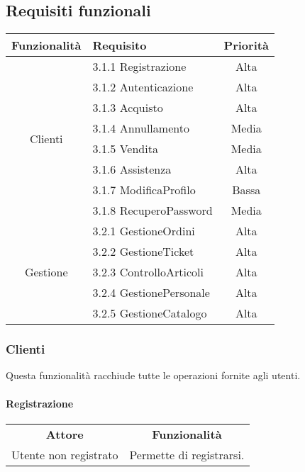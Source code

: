 \documentclass[12pt,a4paper]{article}
\begin{document}
\subsection{Requisiti funzionali}
\begin{center}
\begin{tabular}{|c|l|c|}
\hline
\rowcolor[gray]{0.8}
\textbf{Funzionalità} & \textbf{Requisito} & \textbf{Priorità} \\
\hline
\multirow{8}{*}{Clienti} & 3.1.1 Registrazione & Alta \\
& 3.1.2 Autenticazione & Alta \\
& 3.1.3 Acquisto & Alta \\
& 3.1.4 Annullamento & Media \\
& 3.1.5 Vendita & Media \\
& 3.1.6 Assistenza & Alta \\
& 3.1.7 ModificaProfilo & Bassa \\
& 3.1.8 RecuperoPassword & Media \\
\hline
\multirow{5}{*}{Gestione} & 3.2.1 GestioneOrdini & Alta \\
& 3.2.2 GestioneTicket & Alta \\
& 3.2.3 ControlloArticoli & Alta \\
& 3.2.4 GestionePersonale & Alta \\
& 3.2.5 GestioneCatalogo & Alta \\

\hline
\end{tabular}
\end{center}

\subsubsection{Clienti}
Questa funzionalità racchiude tutte le operazioni fornite agli utenti.

\paragraph*{Registrazione}
\begin{center}
\begin{tabular}{|c|c|}
\rowcolor[gray]{0.8}
\hline
\textbf{Attore} & \textbf{Funzionalità} \\
Utente non registrato & Permette di registrarsi. \\
\hline
\end{tabular}
\end{center}
\end{document}
